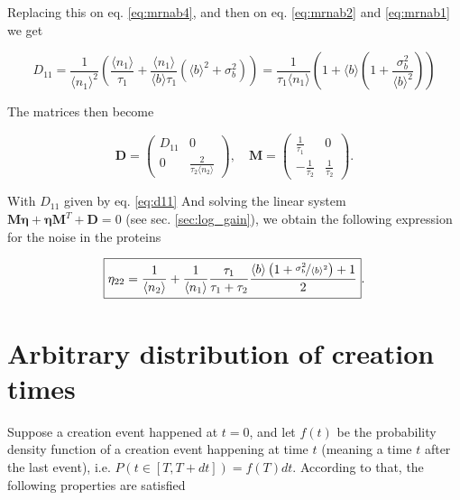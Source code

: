 Replacing this on eq. \eqref{eq:mrnab4}, and then on eq. \eqref{eq:mrnab2} and \eqref{eq:mrnab1} we get

\begin{equation}
  \label{eq:d11}
  D_{11}=\frac{1}{\langle n_1\rangle^2}\left(\frac{\langle n_1\rangle}{\tau_1}+\frac{\langle n_1\rangle}{\langle b\rangle\tau_1}\left(\langle b\rangle^2+\sigma_b^2\right)\right) = \frac{1}{\tau_1\langle n_1\rangle}\left( 1+ \langle b\rangle\left(1+\frac{\sigma_b^2}{\langle b\rangle^2}\right)\right)
\end{equation}

The matrices then become

\begin{equation*}
  \mathbf{D} = 
  \begin{pmatrix}
    D_{11} & 0 \\
    0 & \frac{2}{\tau_2\langle n_2\rangle}
  \end{pmatrix}, \quad
  \mathbf{M} =
  \begin{pmatrix}
    \frac{1}{\tau_1} & 0 \\
    -\frac{1}{\tau_2} & \frac{1}{\tau_2}
  \end{pmatrix}.
\end{equation*}

With $D_{11}$ given by eq. \eqref{eq:d11} And solving the linear system $\mathbf{M}\mathbf{\eta} + \mathbf{\eta M}^T+\mathbf{D}=0$ (see sec. \ref{sec:log_gain}), we obtain the following expression for the noise in the proteins

\begin{equation}
  \boxed{\eta_{22}=\frac{1}{\langle n_2\rangle} + \frac{1}{\langle n_1\rangle} \frac{\tau_1}{\tau_1 + \tau_2} \frac{\langle b\rangle\left(1+\nicefrac{\sigma_b^2}{\langle b\rangle^2}\right)+1}{2}}.
\end{equation}


\section{Arbitrary distribution of creation times}

Suppose a creation event happened at $t=0$, and let $f(t)$ be the probability density function of a creation event happening at time $t$ (meaning a time $t$ after the last event), i.e. $P(t\in[T,T+dt])=f(T)dt$. According to that, the following properties are satisfied

